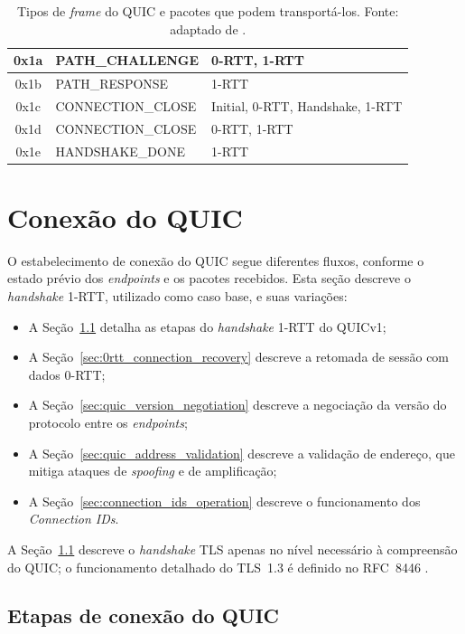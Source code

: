 \begin{table}[!ht]
\begin{tabular}{|c|l|l|}
0x1a       & PATH\_CHALLENGE          & 0-RTT, 1-RTT \\ \hline
0x1b       & PATH\_RESPONSE           & 1-RTT \\ \hline
0x1c       & CONNECTION\_CLOSE        & Initial, 0-RTT, Handshake, 1-RTT \\ \hline
0x1d       & CONNECTION\_CLOSE        & 0-RTT, 1-RTT \\ \hline
0x1e       & HANDSHAKE\_DONE          & 1-RTT \\ \hline
\end{tabular}
\caption{Tipos de \textit{frame} do QUIC e pacotes que podem transportá-los. Fonte: adaptado de \citep{rfc9000}.}
\label{tab:quic_frames_tab}
\end{table}


\section{Conexão do QUIC}
\label{sec:quic_connection}

O estabelecimento de conexão do QUIC segue diferentes fluxos, conforme o estado prévio dos \textit{endpoints} e os pacotes recebidos. Esta seção descreve o \textit{handshake} 1-RTT, utilizado como caso base, e suas variações:

\begin{itemize}
    \item A Seção~\ref{sec:quic_connection_steps} detalha as etapas do \textit{handshake} 1-RTT do QUICv1;
    \item A Seção~\ref{sec:0rtt_connection_recovery} descreve a retomada de sessão com dados 0-RTT;
    \item A Seção~\ref{sec:quic_version_negotiation} descreve a negociação da versão do protocolo entre os \textit{endpoints};
    \item A Seção~\ref{sec:quic_address_validation} descreve a validação de endereço, que mitiga ataques de \textit{spoofing} e de amplificação;
    \item A Seção~\ref{sec:connection_ids_operation} descreve o funcionamento dos \textit{Connection IDs}.
\end{itemize}

A Seção~\ref{sec:quic_connection_steps} descreve o \textit{handshake} TLS apenas no nível necessário à compreensão do QUIC; o funcionamento detalhado do TLS~1.3 é definido no RFC~8446 \citep{rfc8446}.

\subsection{Etapas de conexão do QUIC}
\label{sec:quic_connection_steps}


